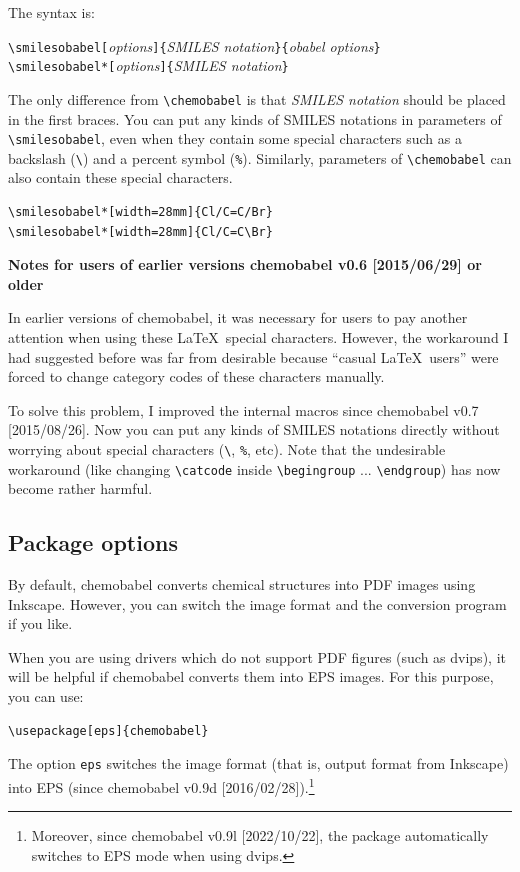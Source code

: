\documentclass[12pt]{ltjsarticle}
\def\Lpack#1{\textsf{#1}}
\def\Lmeta#1{\textit{#1}}
\def\Lver#1{\Lpack{chemobabel} #1}
\begin{document}
The syntax is:
\begin{center}
\verb|\smilesobabel[|\Lmeta{options}\verb|]{|\Lmeta{SMILES notation}\verb|}{|\Lmeta{obabel options}\verb|}| \\
\verb|\smilesobabel*[|\Lmeta{options}\verb|]{|\Lmeta{SMILES notation}\verb|}|
\end{center}
The only difference from \verb|\chemobabel| is that
\Lmeta{SMILES notation} should be placed in the first braces.
You can put any kinds of SMILES notations in parameters of
\verb|\smilesobabel|, even when they contain some special characters
such as a backslash (\verb|\|) and a percent symbol (\verb|%|).
Similarly, parameters of \verb|\chemobabel| can also contain
these special characters.
\begin{verbatim}
\smilesobabel*[width=28mm]{Cl/C=C/Br}
\smilesobabel*[width=28mm]{Cl/C=C\Br}
\end{verbatim}
\begin{figure}[h]
  \centering
   \quad
\end{figure}

\noindent \textbf{Notes for users of earlier versions \Lver{v0.6 [2015/06/29]} or older}

In earlier versions of \Lpack{chemobabel}, it was necessary for users
to pay another attention when using these \LaTeX\ special characters.
However, the workaround I had suggested before was far from desirable
because ``casual \LaTeX\ users'' were forced to change category codes
of these characters manually.

To solve this problem, I improved the internal macros since \Lver{v0.7 [2015/08/26]}.
Now you can put any kinds of SMILES notations directly without worrying
about special characters (\verb|\|, \verb|%|, etc).
Note that the undesirable workaround (like changing \verb|\catcode| inside
\verb|\begingroup| ... \verb|\endgroup|) has now become rather harmful.


\clearpage

\subsection{Package options}

By default, \Lpack{chemobabel} converts chemical structures into
PDF images using Inkscape. However, you can switch the image format
and the conversion program if you like.

When you are using drivers which do not support PDF figures (such as dvips),
it will be helpful if \Lpack{chemobabel} converts them into EPS images.
For this purpose, you can use:
\begin{verbatim}
\usepackage[eps]{chemobabel}
\end{verbatim}
The option \verb|eps| switches the image format
(that is, output format from Inkscape) into EPS (since
\Lver{v0.9d [2016/02/28]}).\footnote{Moreover, since
\Lver{v0.9l [2022/10/22]}, the package automatically switches to
EPS mode when using dvips.}
\end{document}
